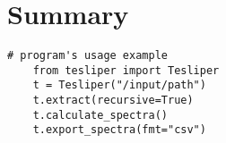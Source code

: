 \chapter{Summary}\label{chapter:summary:en}
\begin{marginscheme}
  
\end{marginscheme}
\begin{marginfigure}
  
\end{marginfigure}
\begin{marginlisting}
  \begin{lstlisting}[emph={recursive,fmt},numbers=none]
    # program's usage example
    from tesliper import Tesliper
    t = Tesliper("/input/path")
    t.extract(recursive=True)
    t.calculate_spectra()
    t.export_spectra(fmt="csv")
  \end{lstlisting}
\end{marginlisting}

